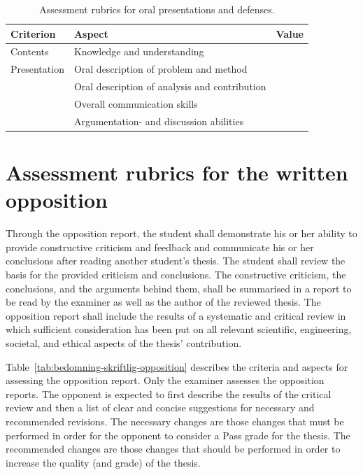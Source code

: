 \documentclass[a4paper,12pt]{book}
\begin{document}
\begin{table}[hbt]
\centering
\caption{Assessment rubrics for oral presentations and defenses.}
\label{tab:bedomning-muntligt-forsvar}
\begin{tabular}{|l|l|l|}
\hline
Criterion       & Aspect                                          & Value \\\hline     
Contents        & Knowledge and understanding                     &       \\\hline     
Presentation    & Oral description of problem and method          &       \\\hline
                & Oral description of analysis and contribution   &       \\\hline
                & Overall communication skills                    &       \\\hline
                & Argumentation- and discussion abilities         &       \\
\hline
\end{tabular}
\end{table} 


\section{Assessment rubrics for the written opposition}
Through the opposition report, the student shall demonstrate his or
her ability to provide constructive criticism and feedback and communicate
his or her conclusions after reading another student's thesis. The
student shall review the basis for the provided criticism and
conclusions. The constructive criticism, the conclusions, and the
arguments behind them, shall be summarised in a report to be read
by the examiner as well as the author of the reviewed thesis.
The opposition report shall include the results of a systematic
and critical review in which sufficient consideration has been put on
all relevant scientific, engineering, societal, and ethical aspects
of the thesis' contribution.

Table~\ref{tab:bedomning-skriftlig-opposition} describes the criteria and aspects
for assessing the opposition report. Only the
examiner assesses the opposition reports. The opponent is expected
to first describe the results of the critical review and then a list of
clear and concise suggestions for necessary and recommended revisions.
The necessary changes are those changes that must be performed in order
for the opponent to consider a Pass grade for the thesis. The recommended
changes are those changes that should be performed in order to increase
the quality (and grade) of the thesis.
\end{document}
